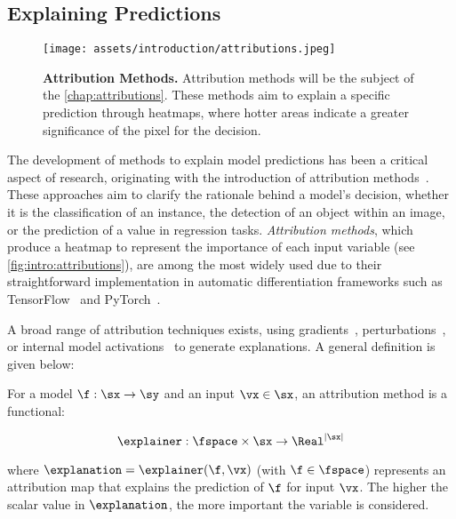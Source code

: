\subsection{Explaining Predictions}

\begin{figure}[ht]
    \centering
    \texttt{[image: assets/introduction/attributions.jpeg]}
    \caption{\textbf{Attribution Methods.} Attribution methods will be the subject of the \autoref{chap:attributions}. These methods aim to explain a specific prediction through heatmaps, where hotter areas indicate a greater significance of the pixel for the decision.}
    \label{fig:intro:attributions}
\end{figure}

The development of methods to explain model predictions has been a critical aspect of research, originating with the introduction of attribution methods~\cite{Zeiler2011}. These approaches aim to clarify the rationale behind a model's decision, whether it is the classification of an instance, the detection of an object within an image, or the prediction of a value in regression tasks. \textit{Attribution methods}, which produce a heatmap to represent the importance of each input variable (see \autoref{fig:intro:attributions}), are among the most widely used due to their straightforward implementation in automatic differentiation frameworks such as TensorFlow~\cite{tensorflow2015} and PyTorch~\cite{paszke2019pytorch}.

A broad range of attribution techniques exists, using gradients~\cite{zeiler2013visualizing,shrikumar2017learning,sundararajan2017axiomatic,smilkov2017smoothgrad}, perturbations~\cite{ancona2017better,petsiuk2018rise,Fong_2017,fel2021sobol,novello2022making}, or internal model activations~\cite{Selvaraju_2019,chattopadhay2018grad} to generate explanations. A general definition is given below:

\begin{definition} 
\label{def:attributions}
For a model $\f : \sx \to \sy$ and an input $\vx \in \sx$, an attribution method is a functional:

\[
\explainer : \fspace \times \sx \to \Real^{|\sx|}
\]

where $\explanation = \explainer(\f, \vx)$ (with $\f \in \fspace$) represents an attribution map that explains the prediction of $\f$ for input $\vx$. The higher the scalar value in $\explanation$, the more important the variable is considered.
\end{definition}

